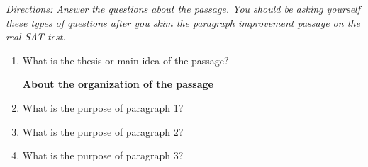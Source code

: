 \textit{Directions: Answer the questions about the passage. You should be asking yourself these types of questions after you skim the paragraph improvement passage on the real SAT test.}

\begin{spacing}{1.5}
\begin{enumerate}
\item What is the thesis or main idea of the passage? \hrulefill

\textbf{About the organization of the passage}
\item What is the purpose of paragraph 1? \hrulefill

\hrulefill

\item What is the purpose of paragraph 2? \hrulefill

\hrulefill

\item What is the purpose of paragraph 3? \hrulefill

\hrulefill
\end{enumerate}
\end{spacing}